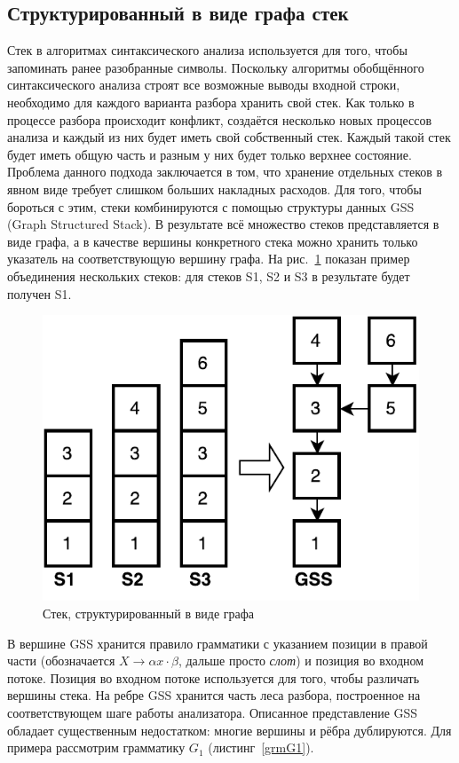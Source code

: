\subsection{Структурированный в виде графа стек}
Стек в алгоритмах синтаксического анализа используется для того, чтобы запоминать ранее разобранные символы. Поскольку алгоритмы обобщённого синтаксического анализа строят все возможные выводы входной строки, необходимо для каждого варианта разбора хранить свой стек. Как только в процессе разбора происходит конфликт, создаётся несколько новых процессов анализа и каждый из них будет иметь свой собственный стек. Каждый такой стек будет иметь общую часть и разным у них будет только верхнее состояние. Проблема данного подхода заключается в том, что хранение отдельных стеков в явном виде требует слишком больших накладных расходов. Для того, чтобы бороться с этим, стеки комбинируются с помощью структуры данных GSS (Graph Structured Stack). В результате всё множество стеков представляется в виде графа, а в качестве вершины конкретного стека можно хранить только указатель на соответствующую вершину графа. На рис.~\ref{GSS} показан пример объединения нескольких стеков: для стеков S1, S2 и S3 в результате будет получен S1.

\begin{figure}
 \centering
 \includegraphics[width=\textwidth]{Ragozina/pics/GSS.pdf}
 \caption{Стек, структурированный в виде графа  }
 \label{GSS}
\end{figure}

В вершине GSS хранится правило грамматики с указанием позиции в правой части (обозначается $X \rightarrow \alpha x \cdot \beta$, дальше просто \textit{слот}) и позиция во входном потоке. Позиция во входном потоке используется для того, чтобы различать вершины стека. На ребре GSS хранится часть леса разбора, построенное на соответствующем шаге работы анализатора. Описанное представление GSS обладает существенным недостатком: многие вершины и рёбра дублируются. Для примера рассмотрим грамматику $G_1$ (листинг~\ref{grmG1}).

